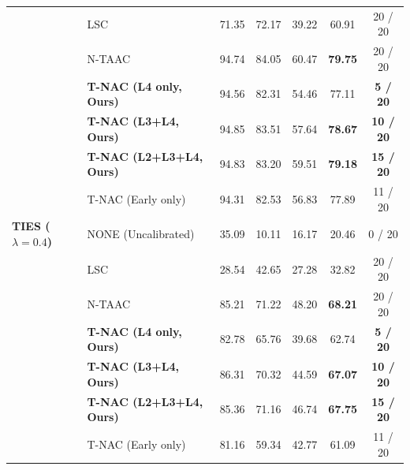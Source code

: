 \documentclass{article}
\theoremstyle{plain}
\theoremstyle{definition}
\begin{document}
\begin{table}[t]
\begin{center}
\begin{scriptsize}
\begin{tabular}{llccccc}
& LSC & 71.35 & 72.17 & 39.22 & 60.91 & 20 / 20 \\
& N-TAAC & 94.74 & 84.05 & 60.47 & \textbf{79.75} & 20 / 20 \\
& \textbf{T-NAC (L4 only, Ours)} & 94.56 & 82.31 & 54.46 & 77.11 & \textbf{5 / 20} \\
& \textbf{T-NAC (L3+L4, Ours)} & 94.85 & 83.51 & 57.64 & \textbf{78.67} & \textbf{10 / 20} \\
& \textbf{T-NAC (L2+L3+L4, Ours)} & 94.83 & 83.20 & 59.51 & \textbf{79.18} & \textbf{15 / 20} \\
& T-NAC (Early only) & 94.31 & 82.53 & 56.83 & 77.89 & 11 / 20 \\
\midrule
\textbf{TIES ($\lambda=0.4$)} & NONE (Uncalibrated) & 35.09 & 10.11 & 16.17 & 20.46 & 0 / 20 \\
& LSC & 28.54 & 42.65 & 27.28 & 32.82 & 20 / 20 \\
& N-TAAC & 85.21 & 71.22 & 48.20 & \textbf{68.21} & 20 / 20 \\
& \textbf{T-NAC (L4 only, Ours)} & 82.78 & 65.76 & 39.68 & 62.74 & \textbf{5 / 20} \\
& \textbf{T-NAC (L3+L4, Ours)} & 86.31 & 70.32 & 44.59 & \textbf{67.07} & \textbf{10 / 20} \\
& \textbf{T-NAC (L2+L3+L4, Ours)} & 85.36 & 71.16 & 46.74 & \textbf{67.75} & \textbf{15 / 20} \\
& T-NAC (Early only) & 81.16 & 59.34 & 42.77 & 61.09 & 11 / 20 \\
\bottomrule
\end{tabular}
\end{scriptsize}
\end{center}
\end{table}
\end{document}
